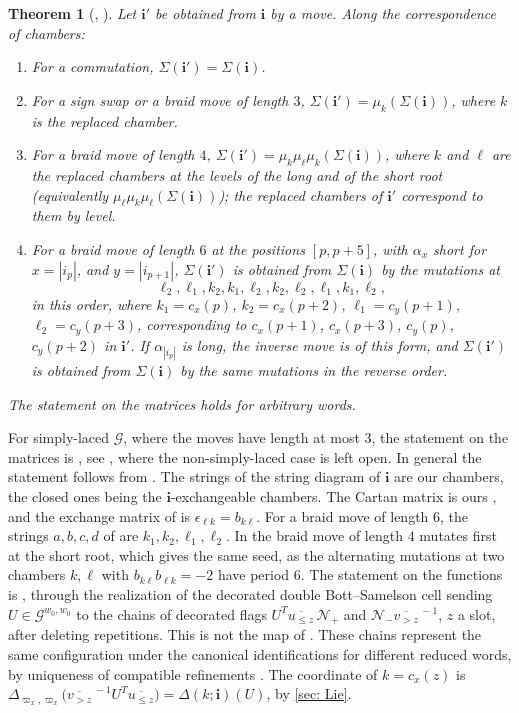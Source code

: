 \documentclass[a4paper]{amsart}
\numberwithin{equation}{section}
\newtheorem{theorem}{Theorem}[section]
\theoremstyle{definition}
\theoremstyle{remark}
\newcommand{\mcG}{\mathcal{G}}
\newcommand{\mcN}{\mathcal{N}}
\newcommand{\bfi}{\mathbf{i}}
\begin{document}
\begin{theorem}[{\cite[Theorem~3.5]{SSVZ00}, \cite[Propositions~3.7 and~3.25]{SW21}}]
  \label{thm: SSVZ}
  Let $\bfi'$ be obtained from $\bfi$ by a move.
  Along the correspondence of chambers:
  \begin{enumerate}
    \item For a commutation, $\Sigma(\bfi')=\Sigma(\bfi)$.
    \item For a sign swap or a braid move of length $3$, $\Sigma(\bfi')=\mu_k(\Sigma(\bfi))$, where $k$ is the replaced chamber.
    \item For a braid move of length $4$, $\Sigma(\bfi')=\mu_k\mu_\ell\mu_k(\Sigma(\bfi))$, where $k$ and $\ell$ are the replaced chambers at the levels of the long and of the short root (equivalently $\mu_\ell\mu_k\mu_\ell(\Sigma(\bfi))$); the replaced chambers of $\bfi'$ correspond to them by level.
    \item For a braid move of length $6$ at the positions $[p,p+5]$, with $\alpha_x$ short for $x=|i_p|$, and $y=|i_{p+1}|$, $\Sigma(\bfi')$ is obtained from $\Sigma(\bfi)$ by the mutations at
    \[\ell_2,\ell_1,k_2,k_1,\ell_2,k_2,\ell_2,\ell_1,k_1,\ell_2,\]
    in this order, where $k_1=c_x(p)$, $k_2=c_x(p+2)$, $\ell_1=c_y(p+1)$, $\ell_2=c_y(p+3)$, corresponding to $c_x(p+1)$, $c_x(p+3)$, $c_y(p)$, $c_y(p+2)$ in $\bfi'$.
    If $\alpha_{|i_p|}$ is long, the inverse move is of this form, and $\Sigma(\bfi')$ is obtained from $\Sigma(\bfi)$ by the same mutations in the reverse order.
  \end{enumerate}
  The statement on the matrices holds for arbitrary words.
\end{theorem}
For simply-laced $\mcG$, where the moves have length at most $3$, the statement on the matrices is \cite[Theorem~3.5]{SSVZ00}, see \cite[Remark~2.14]{BFZ05}, where the non-simply-laced case is left open.
In general the statement follows from \cite[Proposition~3.7]{SW21}.
The strings of the string diagram of $\bfi$ are our chambers, the closed ones being the $\bfi$-exchangeable chambers.
The Cartan matrix is ours \cite[Appendix~A.1]{SW21}, and the exchange matrix of \cite[Section~3.1]{SW21} is $\epsilon_{\ell k}=b_{k\ell}$. For a braid move of length $6$, the strings $a,b,c,d$ of \cite[Proposition~3.7(2)]{SW21} are $k_1,k_2,\ell_1,\ell_2$. In \cite[Proposition~3.7]{SW21} the braid move of length $4$ mutates first at the short root, which gives the same seed, as the alternating mutations at two chambers $k,\ell$ with $b_{k\ell}b_{\ell k}=-2$ have period $6$.
The statement on the functions is \cite[Proposition~3.25]{SW21}, through the realization of the decorated double Bott--Samelson cell \cite[Section~3.3]{SW21} sending $U\in\mcG^{w_0,w_0}$ to the chains of decorated flags $U^T\overline{u_{\le z}}\,\mcN_+$ and $\mcN_-\overline{v_{>z}}^{\,-1}$, $z$ a slot, after deleting repetitions.
  This is not the map of \cite[Section~1.4]{SW21}.
These chains represent the same configuration under the canonical identifications for different reduced words, by uniqueness of compatible refinements \cite[Lemmas~2.10--2.11]{SW21}.
The coordinate \cite[Definition~3.20]{SW21} of $k=c_x(z)$ is $\Delta_{\varpi_x,\varpi_x}\big(\overline{v_{>z}}^{\,-1}U^T\overline{u_{\le z}}\big)=\Delta(k;\bfi)(U)$, by \cref{sec: Lie}.
\end{document}
